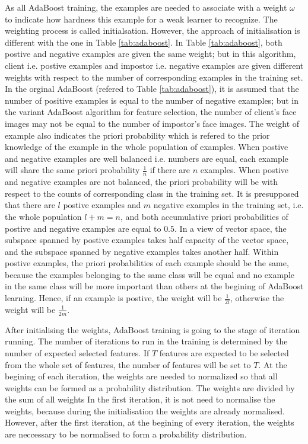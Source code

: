 As all AdaBoost training, the examples are needed to associate with a weight $\omega$ to indicate how hardness this example for a weak learner to recognize. The weighting process is called initialsation. However, the approach of initialisation is different with the one in \mbox{Table} \ref{tab:adaboost}. In \mbox{Table} \ref{tab:adaboost}, both postive and negative examples are given the same weight; but in this algorithm, client i.e. postive examples and impostor i.e. negative examples are given different weights with respect to the number of corresponding examples in the training set. In the orginal AdaBoost (refered to \mbox{Table} \ref{tab:adaboost}), it is assumed that the number of positive examples is equal to the number of negative examples; but in the variant AdaBoost algorithm for feature selection, the number of client's face images may not be equal to the number of impostor's face images. The weight of example also indicates the priori probability which is refered to the prior knowledge of the example in the whole population of examples. When postive and negative examples are well balanced i.e. numbers are equal, each example will share the same priori probability $\frac{1}{n}$ if there are $n$ examples. When postive and negative examples are not balanced, the priori probability will be with respect to the counts of corresponding class in the training set. It is presupposed that there are $l$ postive examples and $m$ negative examples in the training set, i.e. the whole population $l+m=n$, and both accumulative priori probabilities of postive and negative examples are equal to $0.5$. In a view of vector space, the subspace spanned by postive examples takes half capacity of the vector space, and the subspace spanned by negative examples takes another half. Within postive examples, the priori probabilities of each example should be the same, because the examples belonging to the same class will be equal and no example in the same class will be more important than others at the begining of AdaBoost learning. Hence, if an example is postive, the weight will be $\frac{1}{2l}$, otherwise the weight will be $\frac{1}{2m}$.

After initialising the weights, AdaBoost training is going to the stage of iteration running. The number of iterations to run in the training is determined by the number of expected selected features.  If $T$ features are expected to be selected from the whole set of features, the number of features will be set to $T$. At the begining of each iteration, the weights are needed to normalized so that all weights can be formed as a probability distribution. The weights are divided by the sum of all weights  In the first iteration, it is not need to normalise the weights, because during the initialisation the weights are already normalised. However, after the first iteration, at the begining of every iteration, the weights are neccessary to be normalised to form a probability distribution. 

